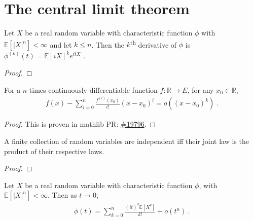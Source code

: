 \chapter{The central limit theorem}

\begin{lemma}\label{lem:deriv_charFun}
\leanok
{}
Let $X$ be a real random variable with characteristic function $\phi$ with $\mathbb{E}[\vert X \vert^n] < \infty$ and let $k \le n$.
Then the $k$\textsuperscript{th} derivative of $\phi$ is
$\phi^{(k)}(t) = \mathbb{E}[i X]^k e^{i t X}$ \: .
\end{lemma}

\begin{proof}\leanok
{}
\end{proof}

\begin{lemma}\label{lem:taylor_peano}
\leanok
{}
For a $n$-times continuously differentiable function $f : \mathbb{R} \to E$, for any $x_0\in\mathbb{R}$,
\begin{align*}
f(x) - \sum_{i=0}^n\frac{f^{(i)}(x_0)}{i!}(x-x_0)^i = o((x - x_0)^k)
\: .
\end{align*}
\end{lemma}

\begin{proof}
This is proven in mathlib PR: \href{https://github.com/leanprover-community/mathlib4/pull/19796}{\#19796}.
\end{proof}

\begin{lemma}\label{lem:iIndepFun_iff_pi_map_eq_map}
\mathlibok
{}
A finite collection of random variables are independent iff their joint law is the product of their respective laws.
\end{lemma}

\begin{proof}\leanok
\end{proof}

\begin{lemma}\label{lem:charFun_taylor}
\leanok
{}
Let $X$ be a real random variable with characteristic function $\phi$, with $\mathbb{E}[\vert X \vert^n] < \infty$. Then as $t \to 0$,
\begin{align*}
\phi(t) = \sum_{k=0}^n \frac{(it)^k \mathbb{E}[X^k]}{k!} + o(t^n)
\: .
\end{align*}
\end{lemma}

